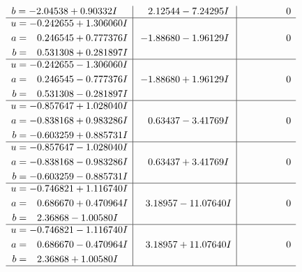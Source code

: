 \documentclass[1p]{elsarticle_modified}
\theoremstyle{definition}
\begin{document}
$$\begin{array}{c|c|c}
\begin{aligned}
b &= -2.04538 + 0.90332 I\end{aligned}
 & \phantom{-}2.12544 - 7.24295 I & \phantom{-0.000000 } 0 \\ \hline\begin{aligned}
u &= -0.242655 + 1.306060 I \\
a &= \phantom{-}0.246545 + 0.777376 I \\
b &= \phantom{-}0.531308 + 0.281897 I\end{aligned}
 & -1.88680 - 1.96129 I & \phantom{-0.000000 } 0 \\ \hline\begin{aligned}
u &= -0.242655 - 1.306060 I \\
a &= \phantom{-}0.246545 - 0.777376 I \\
b &= \phantom{-}0.531308 - 0.281897 I\end{aligned}
 & -1.88680 + 1.96129 I & \phantom{-0.000000 } 0 \\ \hline\begin{aligned}
u &= -0.857647 + 1.028040 I \\
a &= -0.838168 + 0.983286 I \\
b &= -0.603259 + 0.885731 I\end{aligned}
 & \phantom{-}0.63437 - 3.41769 I & \phantom{-0.000000 } 0 \\ \hline\begin{aligned}
u &= -0.857647 - 1.028040 I \\
a &= -0.838168 - 0.983286 I \\
b &= -0.603259 - 0.885731 I\end{aligned}
 & \phantom{-}0.63437 + 3.41769 I & \phantom{-0.000000 } 0 \\ \hline\begin{aligned}
u &= -0.746821 + 1.116740 I \\
a &= \phantom{-}0.686670 + 0.470964 I \\
b &= \phantom{-}2.36868 - 1.00580 I\end{aligned}
 & \phantom{-}3.18957 - 11.07640 I & \phantom{-0.000000 } 0 \\ \hline\begin{aligned}
u &= -0.746821 - 1.116740 I \\
a &= \phantom{-}0.686670 - 0.470964 I \\
b &= \phantom{-}2.36868 + 1.00580 I\end{aligned}
 & \phantom{-}3.18957 + 11.07640 I & \phantom{-0.000000 } 0\\
 \hline 
 \end{array}$$\newpage$$\begin{array}{c|c|c}  

\end{array}$$
\end{document}
